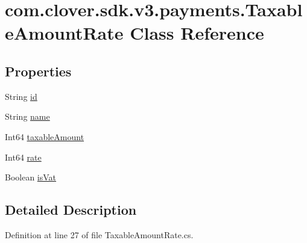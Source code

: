 \hypertarget{classcom_1_1clover_1_1sdk_1_1v3_1_1payments_1_1_taxable_amount_rate}{}\section{com.\+clover.\+sdk.\+v3.\+payments.\+Taxable\+Amount\+Rate Class Reference}
\label{classcom_1_1clover_1_1sdk_1_1v3_1_1payments_1_1_taxable_amount_rate}
\subsection*{Properties}
\begin{DoxyCompactItemize}
\item 
String \hyperlink{classcom_1_1clover_1_1sdk_1_1v3_1_1payments_1_1_taxable_amount_rate_a76b817580e3c7a9a073948637383423a}{id}
\item 
String \hyperlink{classcom_1_1clover_1_1sdk_1_1v3_1_1payments_1_1_taxable_amount_rate_aec6c4dd635c912362efac5542acfdc54}{name}
\item 
Int64 \hyperlink{classcom_1_1clover_1_1sdk_1_1v3_1_1payments_1_1_taxable_amount_rate_a45ab1aca938e58b5f1f9e7ea46c8dcb7}{taxable\+Amount}
\item 
Int64 \hyperlink{classcom_1_1clover_1_1sdk_1_1v3_1_1payments_1_1_taxable_amount_rate_af6f06f8ca87233452782565070c448f1}{rate}
\item 
Boolean \hyperlink{classcom_1_1clover_1_1sdk_1_1v3_1_1payments_1_1_taxable_amount_rate_aee35743015a198379fbf1465cfa74b2e}{is\+Vat}
\end{DoxyCompactItemize}


\subsection{Detailed Description}


Definition at line 27 of file Taxable\+Amount\+Rate.\+cs.



